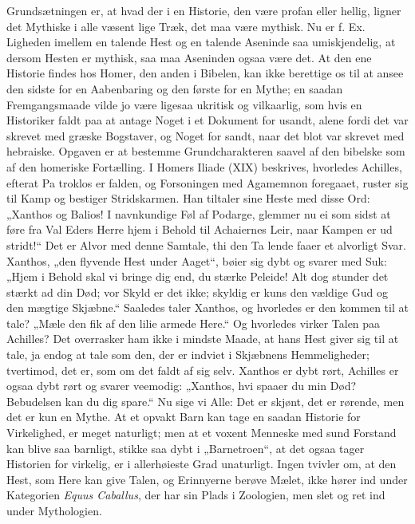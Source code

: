 \documentclass[12pt]{book}
\newcommand{\opage}[1]{\marginnote{\footnotesize\textit{[#1]}}}
\begin{document}
Grundsætningen er, at hvad der i en Historie, den
være profan eller hellig, ligner det Mythiske i alle væsent\-%
lige Træk, det maa være mythisk. Nu er f. Ex. Ligheden
imellem en talende Hest og en talende Aseninde saa
umiskjendelig, at dersom Hesten er mythisk, saa maa
Aseninden ogsaa være det. At den ene Historie findes
hos Homer, den anden i Bibelen, kan ikke berettige os
til at ansee den sidste for en Aabenbaring og den første
for en Mythe; en saadan Fremgangsmaade vilde jo være
\opage{156}\setcounter{footnote}{0}%
ligesaa ukritisk og vilkaarlig, som hvis en Historiker
faldt paa at antage Noget i et Dokument for usandt,
alene fordi det var skrevet med græske Bogstaver, og
Noget for sandt, naar det blot var skrevet med hebraiske.
Opgaven er at bestemme Grundcharakteren saavel af
den bibelske som af den homeriske Fortælling. I Homers
Iliade (XIX) beskrives, hvorledes Achilles, efterat Pa\-%
troklos er falden, og Forsoningen med Agamemnon
foregaaet, ruster sig til Kamp og bestiger Stridskarmen.
Han tiltaler sine Heste med disse Ord: „Xanthos
og Balios! I navnkundige Føl af Podarge, glemmer
nu ei som sidst at føre fra Val Eders Herre hjem
i Behold til Achaiernes Leir, naar Kampen er ud\-%
stridt!“ Det er Alvor med denne Samtale, thi den Ta\-%
lende faaer et alvorligt Svar. Xanthos, „den flyvende
Hest under Aaget“, bøier sig dybt og svarer med Suk:
„Hjem i Behold skal vi bringe dig end, du stærke Peleide!
Alt dog stunder det stærkt ad din Død; vor Skyld er
det ikke; skyldig er kuns den vældige Gud og den
mægtige Skjæbne.“ Saaledes taler Xanthos, og hvorledes
er den kommen til at tale? „Mæle den fik af den lilie\-%
armede Here.“ Og hvorledes virker Talen paa Achilles?
Det overrasker ham ikke i mindste Maade, at hans Hest
giver sig til at tale, ja endog at tale som den, der er
indviet i Skjæbnens Hemmeligheder; tvertimod, det er,
som om det faldt af sig selv. Xanthos er dybt rørt,
Achilles er ogsaa dybt rørt og svarer veemodig:
„Xanthos, hvi spaaer du min Død? Bebudelsen kan
du dig spare.“ Nu sige vi Alle: Det er skjønt, det er
rørende, men det er kun en Mythe. At et opvakt Barn
kan tage en saadan Historie for Virkelighed, er meget
naturligt; men at et voxent Menneske med sund Forstand
kan blive saa barnligt, stikke saa dybt i „Barnetroen“,
at det ogsaa tager Historien for virkelig, er i allerhøieste
\opage{157}\setcounter{footnote}{0}%
Grad unaturligt. Ingen tvivler om, at den Hest, som
Here kan give Talen, og Erinnyerne berøve Mælet, ikke
hører ind under Kategorien \textit{Equus Caballus}, der har sin
Plads i Zoologien, men slet og ret ind under Mythologien.
\end{document}
